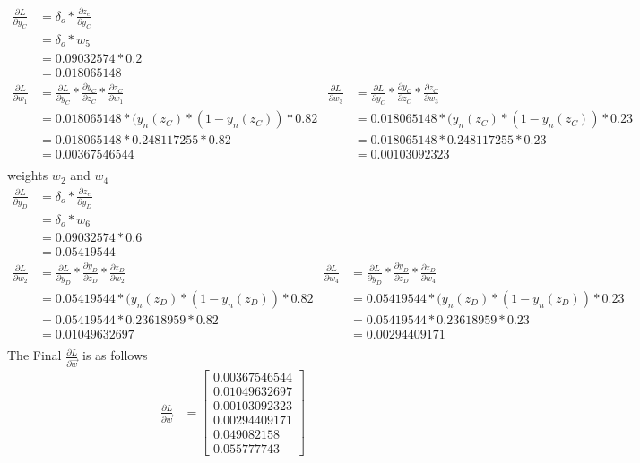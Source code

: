 \documentclass[12pt,english]{article}
\begin{document}
\begin{align*}
 \frac{\partial L}{\partial y_C}  &= \delta_o * \frac{\partial z_e}{\partial y_C}\\
&= \delta_o * w_5\\
&= 0.09032574 * 0.2\\
&=0.018065148\\
\frac{\partial L}{\partial w_1} &=\frac{\partial L}{\partial y_C} * \frac{\partial y_C}{\partial z_C} * \frac{\partial z_C}{\partial w_1} &
\frac{\partial L}{\partial w_3} &=\frac{\partial L}{\partial y_C} * \frac{\partial y_C}{\partial z_C} * \frac{\partial z_C}{\partial w_3} \\
&=0.018065148 * (y_n(z_C) *(1 -y_n(z_C)) *0.82 &
&=0.018065148 * (y_n(z_C) *(1 -y_n(z_C)) * 0.23\\
&=0.018065148 * 0.248117255 * 0.82 &
&=0.018065148 * 0.248117255 * 0.23\\
&=0.00367546544 &
&=0.00103092323\\
\end{align*}
weights $w_2$ and $w_4$
\begin{align*}
 \frac{\partial L}{\partial y_D}  &= \delta_o * \frac{\partial z_e}{\partial y_D}\\
&= \delta_o * w_6\\
&= 0.09032574 * 0.6\\
&= 0.05419544\\
\frac{\partial L}{\partial w_2} &=\frac{\partial L}{\partial y_D} * \frac{\partial y_D}{\partial z_D} * \frac{\partial z_D}{\partial w_2} &
\frac{\partial L}{\partial w_4} &=\frac{\partial L}{\partial y_D} * \frac{\partial y_D}{\partial z_D} * \frac{\partial z_D}{\partial w_4} \\
&=0.05419544 * (y_n(z_D) *(1 -y_n(z_D)) * 0.82 &
&=0.05419544 * (y_n(z_D) *(1 -y_n(z_D)) * 0.23\\
&=0.05419544 * 0.23618959 * 0.82 &
&=0.05419544 * 0.23618959 * 0.23\\
&=0.01049632697 &
&=0.00294409171\\
\end{align*}
The Final $\frac{\partial L}{\partial\vec{w}}$ is as follows
\begin{align*}
\frac{\partial L}{\partial\vec{w}} &= \begin{bmatrix} 0.00367546544 \\0.01049632697 \\0.00103092323\\0.00294409171\\0.049082158\\0.055777743\end{bmatrix}
\end{align*}
\end{document}
